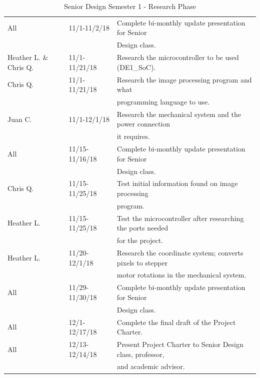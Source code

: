 \begin{table} [H]
\begin{tabular}{|l|l|l|}
		\hline
		All & 11/1-11/2/18 & 
		Complete bi-monthly update presentation for Senior \\
		& & Design class. \\
		\hline
		Heather L. \& Chris Q. & 11/1-11/21/18 & 
		Research the microcontroller to be used  (DE1\_SoC).\\
		\hline
		Chris Q. & 11/1-11/21/18 & 
		Research the image processing program and what  \\
		& & programming language to use.\\
		\hline
		Juan C. & 11/1-12/1/18 &
		Research the mechanical system and the power connection \\
		& & it requires. \\
		\hline
		
		All & 11/15-11/16/18 & Complete bi-monthly update presentation for Senior \\
		& & Design class. \\
		\hline
		Chris Q. & 11/15-11/25/18 & Test initial information found on image processing\\
		& & program. \\
		\hline
		Heather L. & 11/15-11/25/18 & Test the microcontroller after researching the ports needed \\
		& & for the project.\\
		\hline
		Heather L. & 11/20-12/1/18 & Research the coordinate system; converts pixels to stepper \\
		& & motor rotations in the mechanical system.\\
		\hline
		All & 11/29-11/30/18 & 
		Complete bi-monthly update presentation for Senior \\
		& & Design class. \\
		\hline
		All & 12/1-12/17/18 & 
		Complete the final draft of the Project Charter.\\
		\hline
		All & 12/13-12/14/18 & 
		Present Project Charter to Senior Design class, professor, \\
		& & and academic advisor.\\
		\hline
\end{tabular} 
\caption{Senior Design Semester 1 - Research Phase}
\label{table:3}
\end{table}

